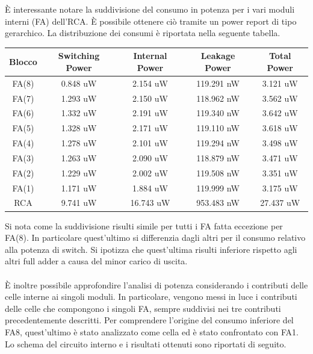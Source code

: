 \documentclass[11pt,  english, makeidx, a4paper, titlepage, oneside]{book}
\begin{document}
È interessante notare la suddivisione del consumo in potenza per i vari moduli interni (FA) dell'RCA. È possibile ottenere ciò tramite un power report di tipo gerarchico. La distribuzione dei consumi è riportata nella seguente tabella.
\\
\begin{center}
	\begin{tabular}{|c|c|c|c|c|}
	\hline
	Blocco &  Switching Power & Internal Power & Leakage Power & Total Power \\ 
	\hline
	FA(8) & 0.848 uW & 2.154 uW & 119.291 nW & 3.121 uW  \\
	\hline
	FA(7) & 1.293 uW & 2.150 uW & 118.962 nW & 3.562 uW  \\
	\hline
	FA(6) & 1.332 uW & 2.191 uW & 119.340 nW & 3.642 uW  \\
	\hline
	FA(5) & 1.328 uW & 2.171 uW & 119.110 nW & 3.618 uW  \\
	\hline
	FA(4) & 1.278 uW & 2.101 uW & 119.294 nW & 3.498 uW  \\
	\hline
	FA(3) & 1.263 uW & 2.090 uW & 118.879 nW & 3.471 uW  \\
	\hline
	FA(2) & 1.229 uW & 2.002 uW & 119.508 nW & 3.351 uW  \\
	\hline
	FA(1) & 1.171 uW & 1.884 uW & 119.999 nW & 3.175 uW  \\
	\hline
	RCA & 9.741 uW & 16.743 uW & 953.483 nW & 27.437 uW  \\
	\hline
	\end{tabular}
\end{center}
\vspace{0.3cm}
Si nota come la suddivisione risulti simile per tutti i FA fatta eccezione per FA(8). In particolare quest'ultimo si differenzia dagli altri per il consumo relativo alla potenza di switch. Si ipotizza che quest'ultima risulti inferiore rispetto agli altri full adder a causa del minor carico di uscita.
\\\\
È inoltre possibile approfondire l'analisi di potenza considerando i contributi delle celle interne ai singoli moduli. In particolare, vengono messi in luce i contributi delle celle che compongono i singoli FA, sempre suddivisi nei tre contributi precedentemente descritti.
Per comprendere l'origine del consumo inferiore del FA8, quest'ultimo è stato analizzato come cella ed è stato confrontato con FA1.
Lo schema del circuito interno e i risultati ottenuti sono riportati di seguito.
\\\\
\end{document}
